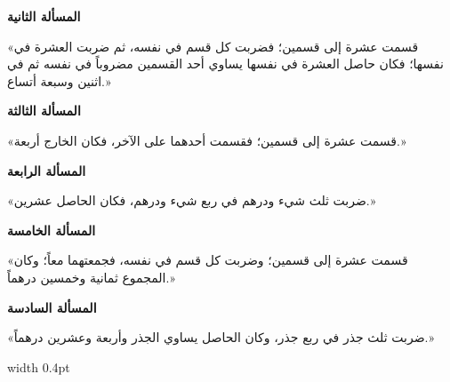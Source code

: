 \documentclass[11pt,a4paper]{book}
\begin{document}
\newpage

\noindent\begin{minipage}[t]{0.48\textwidth}
\raggedleft

\begin{Arabic}
\textbf{المسألة الثانية}

«قسمت عشرة إلى قسمين؛ فضربت كل قسم في نفسه، ثم ضربت العشرة في نفسها؛ فكان حاصل العشرة في نفسها يساوي أحد القسمين مضروباً في نفسه ثم في اثنين وسبعة أتساع.»

\textbf{المسألة الثالثة}

«قسمت عشرة إلى قسمين؛ فقسمت أحدهما على الآخر، فكان الخارج أربعة.»

\textbf{المسألة الرابعة}

«ضربت ثلث شيء ودرهم في ربع شيء ودرهم، فكان الحاصل عشرين.»

\textbf{المسألة الخامسة}

«قسمت عشرة إلى قسمين؛ وضربت كل قسم في نفسه، فجمعتهما معاً؛ وكان المجموع ثمانية وخمسين درهماً.»

\textbf{المسألة السادسة}

«ضربت ثلث جذر في ربع جذر، وكان الحاصل يساوي الجذر وأربعة وعشرين درهماً.»
\end{Arabic}

\end{minipage}%
\hfill\vrule width 0.4pt\hfill
\end{document}
